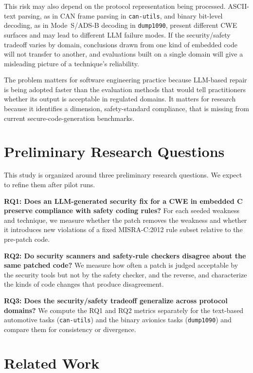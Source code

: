\documentclass[12pt]{IEEEtran}
\begin{document}
This risk may also depend on the protocol representation being processed. ASCII-text parsing, as in CAN frame parsing in \texttt{can-utils}, and binary bit-level decoding, as in Mode~S/ADS-B decoding in \texttt{dump1090}, present different CWE surfaces and may lead to different LLM failure modes. If the security/safety tradeoff varies by domain, conclusions drawn from one kind of embedded code will not transfer to another, and evaluations built on a single domain will give a misleading picture of a technique's reliability.

The problem matters for software engineering practice because LLM-based repair is being adopted faster than the evaluation methods that would tell practitioners whether its output is acceptable in regulated domains. It matters for research because it identifies a dimension, safety-standard compliance, that is missing from current secure-code-generation benchmarks.

\section{Preliminary Research Questions}
This study is organized around three preliminary research questions. We expect to refine them after pilot runs.

\textbf{RQ1: Does an LLM-generated security fix for a CWE in embedded C preserve compliance with safety coding rules?}
For each seeded weakness and technique, we measure whether the patch removes the weakness and whether it introduces new violations of a fixed MISRA-C:2012 rule subset relative to the pre-patch code.

\textbf{RQ2: Do security scanners and safety-rule checkers disagree about the same patched code?}
We measure how often a patch is judged acceptable by the security tools but not by the safety checker, and the reverse, and characterize the kinds of code changes that produce disagreement.

\textbf{RQ3: Does the security/safety tradeoff generalize across protocol domains?}
We compute the RQ1 and RQ2 metrics separately for the text-based automotive tasks (\texttt{can-utils}) and the binary avionics tasks (\texttt{dump1090}) and compare them for consistency or divergence.

\section{Related Work}
\end{document}
